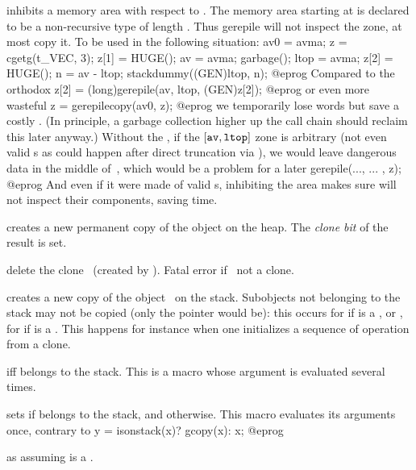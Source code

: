  inhibits a memory area with respect to
. The memory area starting at  is declared to be a
non-recursive type of length . Thus gerepile will not inspect the zone,
at most copy it. To be used in the following situation:
\bprog
  av0 = avma; z = cgetg(t_VEC, 3);
  z[1] = HUGE(); av = avma; garbage(); ltop = avma;
  z[2] = HUGE(); n = av - ltop; stackdummy((GEN)ltop, n);
@eprog\noindent
Compared to the orthodox
\bprog
  z[2] = (long)gerepile(av, ltop, (GEN)z[2]);
@eprog\noindent
or even more wasteful
\bprog
  z = gerepilecopy(av0, z);
@eprog\noindent
we temporarily lose  words but save a costly . (In
principle, a garbage collection higher up the call chain should reclaim this
later anyway.) Without the , if the $[{\tt av}, {\tt ltop}]$
zone is arbitrary (not even valid s as could happen after direct
truncation via ), we would leave dangerous data in the middle
of~, which would be a problem for a later
\bprog
  gerepile(..., ... , z);
@eprog\noindent
And even if it were made of valid s, inhibiting the area makes sure
 will not inspect their components, saving time.


 creates a new permanent copy of the object 
on the heap. The \emph{clone bit} of the result is set.

 delete the clone~ (created by ).
Fatal error if~ not a clone.

 creates a new copy of the object~ on the
stack. Subobjects not belonging to the stack may not be copied (only the
pointer would be): this occurs for  if  is a ,
 or , for  if  is a . This
happens for instance when one initializes a sequence of operation from a
clone.

  iff  belongs to the stack. This
is a macro whose argument is evaluated several times.

 sets  if
 belongs to the stack, and  otherwise. This macro evaluates
its arguments once, contrary to
\bprog
  y = isonstack(x)? gcopy(x): x;
@eprog

 as  assuming 
is a .

